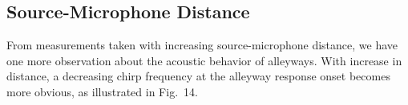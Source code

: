 \documentclass{aes137}
\begin{document}

%




\subsection{Source-Microphone Distance}
From measurements taken with increasing source-microphone distance, we have one more observation about the acoustic behavior of alleyways. With increase in distance, a decreasing chirp frequency at the alleyway response onset becomes more obvious, as illustrated in Fig.~14.
\end{document}
